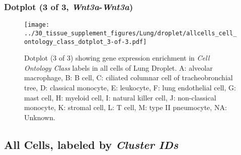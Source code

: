\clearpage

\subsubsection{Dotplot (3 of 3, \emph{Wnt3a}-\emph{Wnt3a})}
\begin{figure}[h]
\centering
\texttt{[image: ../30\_tissue\_supplement\_figures/Lung/droplet/allcells\_cell\_ontology\_class\_dotplot\_3-of-3.pdf]}

\caption{ Dotplot (3 of 3)  showing gene expression enrichment in \emph{Cell Ontology Class} labels in all cells of Lung Droplet. A: alveolar macrophage, B: B cell, C: ciliated columnar cell of tracheobronchial tree, D: classical monocyte, E: leukocyte, F: lung endothelial cell, G: mast cell, H: myeloid cell, I: natural killer cell, J: non-classical monocyte, K: stromal cell, L: T cell, M: type II pneumocyte, NA: Unknown.}
\end{figure}


\clearpage

\subsection{All Cells, labeled by \emph{Cluster IDs}}
